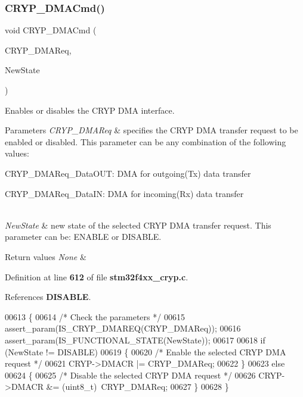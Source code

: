 \subsubsection{C\+R\+Y\+P\+\_\+\+D\+M\+A\+Cmd()}
{\footnotesize\ttfamily void C\+R\+Y\+P\+\_\+\+D\+M\+A\+Cmd (\begin{DoxyParamCaption}\item[{uint8\+\_\+t}]{C\+R\+Y\+P\+\_\+\+D\+M\+A\+Req,  }\item[{\textbf{ Functional\+State}}]{New\+State }\end{DoxyParamCaption})}



Enables or disables the C\+R\+YP D\+MA interface. 


\begin{DoxyParams}{Parameters}
{\em C\+R\+Y\+P\+\_\+\+D\+M\+A\+Req} & specifies the C\+R\+YP D\+MA transfer request to be enabled or disabled. This parameter can be any combination of the following values\+: \begin{DoxyItemize}
\item C\+R\+Y\+P\+\_\+\+D\+M\+A\+Req\+\_\+\+Data\+O\+UT\+: D\+MA for outgoing(\+Tx) data transfer \item C\+R\+Y\+P\+\_\+\+D\+M\+A\+Req\+\_\+\+Data\+IN\+: D\+MA for incoming(\+Rx) data transfer \end{DoxyItemize}
\\
\hline
{\em New\+State} & new state of the selected C\+R\+YP D\+MA transfer request. This parameter can be\+: E\+N\+A\+B\+LE or D\+I\+S\+A\+B\+LE. \\
\hline
\end{DoxyParams}

\begin{DoxyRetVals}{Return values}
{\em None} & \\
\hline
\end{DoxyRetVals}


Definition at line \textbf{ 612} of file \textbf{ stm32f4xx\+\_\+cryp.\+c}.



References \textbf{ D\+I\+S\+A\+B\+LE}.


\begin{DoxyCode}
00613 \{
00614   \textcolor{comment}{/* Check the parameters */}
00615   assert_param(IS_CRYP_DMAREQ(CRYP\_DMAReq));
00616   assert_param(IS_FUNCTIONAL_STATE(NewState));
00617 
00618   \textcolor{keywordflow}{if} (NewState != DISABLE)
00619   \{
00620     \textcolor{comment}{/* Enable the selected CRYP DMA request */}
00621     CRYP->DMACR |= CRYP\_DMAReq;
00622   \}
00623   \textcolor{keywordflow}{else}
00624   \{
00625     \textcolor{comment}{/* Disable the selected CRYP DMA request */}
00626     CRYP->DMACR &= (uint8\_t)~CRYP\_DMAReq;
00627   \}
00628 \}
\end{DoxyCode}
